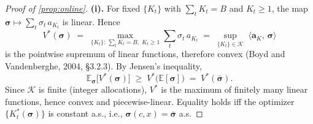 \begin{proof}[Proof of \cref{prop:online}]
\textbf{(i).}\;
For fixed $\{K_t\}$ with $\sum_t K_t=B$ and $K_t\ge 1$, the map
$\boldsymbol{\sigma}\mapsto\sum_t\sigma_t\,a_{K_t}$ is linear.
Hence
\[
  V^*(\boldsymbol{\sigma})
  \;=\;
  \max_{\{K_t\}:\,\sum_t K_t=B,\;K_t\ge 1}
  \sum_t\sigma_t\,a_{K_t}
  \;=\;
  \sup_{\{K_t\}\in\mathcal{K}}\;
  \langle\boldsymbol{a}_K,\,\boldsymbol{\sigma}\rangle
\]
is the pointwise supremum of linear functions, therefore convex
(Boyd and Vandenberghe, 2004, \S3.2.3).
By Jensen's inequality,
\[
  \mathbb{E}_{\boldsymbol{\sigma}}
  \bigl[V^*(\boldsymbol{\sigma})\bigr]
  \;\ge\;
  V^*\!\bigl(\mathbb{E}[\boldsymbol{\sigma}]\bigr)
  \;=\;
  V^*(\bar{\boldsymbol{\sigma}}).
\]
Since $\mathcal{K}$ is finite (integer allocations), $V^*$ is the
maximum of finitely many linear functions, hence convex and
piecewise-linear.
Equality holds iff the optimizer
$\{K_t^*(\boldsymbol{\sigma})\}$ is constant a.s., i.e.,
$\boldsymbol{\sigma}(c,x)=\bar{\boldsymbol{\sigma}}$ a.s.


\end{proof}
